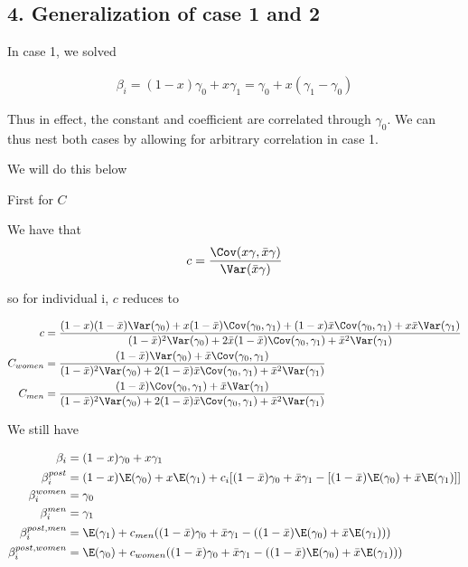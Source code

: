 \subsection*{4. Generalization of case 1 and 2} \label{sssec:num4}

In case 1, we solved 

\begin{align*}
	\beta_i = (1 - x) \gamma_0 + x \gamma_1 = \gamma_0 + x(\gamma_1 - \gamma_0)
\end{align*} 

Thus in effect, the constant and coefficient are correlated through $\gamma_0$. We can thus nest both cases by allowing for arbitrary correlation in case 1.


We will do this below

First for $C$ 

We have that
\begin{align*}
	c = \frac{\Cov (x \gamma, \bar{x} \gamma)}{ \Var( \bar{x} \gamma )}
\end{align*} 

so for individual i, $c$ reduces to

\begin{align*}
	c &= \frac{(1-x)(1 - \bar{x})\Var(\gamma_0) + x (1 - \bar{x}) \Cov(\gamma_0, \gamma_1) +(1 - x)\bar{x}  \Cov(\gamma_0, \gamma_1) +   x \bar{x} \Var(\gamma_1)}{(1- \bar{x})^2 \Var(\gamma_0) + 2 \bar{x}(1-\bar{x}) \Cov(\gamma_0, \gamma_1) + \bar{x}^2\Var(\gamma_1)} \\
	C_{women} &= \frac{(1 - \bar{x})\Var(\gamma_0) + \bar{x} \Cov(\gamma_0, \gamma_1)}{(1-\bar{x})^2\Var(\gamma_0) + 2 (1 - \bar{x})\bar{x} \Cov(\gamma_0, \gamma_1) + \bar{x}^2\Var(\gamma_1)} \\
	C_{men} &= \frac{(1 - \bar{x}) \Cov(\gamma_0, \gamma_1) + \bar{x} \Var(\gamma_1)}{(1-\bar{x})^2\Var(\gamma_0) + 2 (1 - \bar{x})\bar{x} \Cov(\gamma_0, \gamma_1) + \bar{x}^2\Var(\gamma_1)} \\
\end{align*} 

We still have

\begin{align*}
	\beta_i &= (1 -x)\gamma_0 + x \gamma_1 \\
	\beta_{i}^{post} &= (1-x)\E(\gamma_0) + x\E(\gamma_1)  + c_i [ (1-\bar{x})\gamma_0 + \bar{x} \gamma_1 - [ (1- \bar{x})\E(\gamma_0) + \bar{x} \E(\gamma_1) ] ] \\
	\beta_i^{women} &= \gamma_0 \\
	\beta_i^{men} &=  \gamma_1 \\
	\beta_i^{post,men} &=  \E(\gamma_1)  + c_{men} ((1-\bar{x})\gamma_0 + \bar{x} \gamma_1 - ((1-\bar{x})\E(\gamma_0) + \bar{x} \E(\gamma_1))) \\
	\beta_i^{post, women} &= \E(\gamma_0) +  c_{women} ((1-\bar{x}) \gamma_0 + \bar{x} \gamma_1 - ((1-\bar{x})\E(\gamma_0) + \bar{x} \E(\gamma_1))) \\
\end{align*} 

